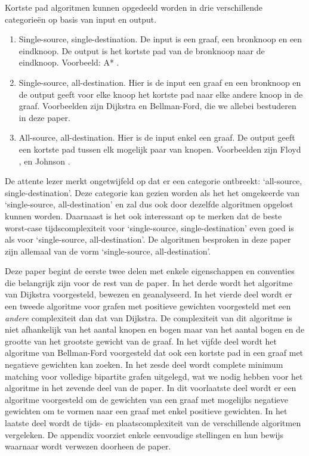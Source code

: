 \documentclass[conference]{IEEEtran}
\theoremstyle{definition}
\begin{document}
Kortste pad algoritmen kunnen opgedeeld worden in drie verschillende categorieën op basis van input en output.
\begin{enumerate}
    \item Single-source, single-destination. De input is een graaf, een bronknoop en een eindknoop. De output is het kortste pad van de bronknoop naar de eindknoop. Voorbeeld: A* \cite{A*}.
    \item Single-source, all-destination. Hier is de input een graaf en een bronknoop en de output geeft voor elke knoop het kortste pad naar elke andere knoop in de graaf. Voorbeelden zijn Dijkstra en Bellman-Ford, die we allebei bestuderen in deze paper.
    \item All-source, all-destination. Hier is de input enkel een graaf. De output geeft een kortste pad tussen elk mogelijk paar van knopen. Voorbeelden zijn Floyd \cite{Floyd}, en Johnson \cite{Johnson}.
\end{enumerate}
De attente lezer merkt ongetwijfeld op dat er een categorie ontbreekt: `all-source, single-destination'. Deze categorie kan gezien worden als het het omgekeerde van `single-source, all-destination' en zal dus ook door dezelfde algoritmen opgelost kunnen worden. Daarnaast is het ook interessant op te merken dat de beste worst-case tijdscomplexiteit voor `single-source, single-destination' even goed is als voor `single-source, all-destination'.
De algoritmen besproken in deze paper zijn allemaal van de vorm `single-source, all-destination'.

Deze paper begint de eerste twee delen met enkele eigenschappen en conventies die belangrijk zijn voor de rest van de paper.
In het derde wordt het algoritme van Dijkstra voorgesteld, bewezen en geanalyseerd.
In het vierde deel wordt er een tweede algoritme voor grafen met positieve gewichten voorgesteld met een \emph{andere} complexiteit dan dat van Dijkstra. De complexiteit van dit algoritme is niet afhankelijk van het aantal knopen en bogen maar van het aantal bogen en de grootte van het grootste gewicht van de graaf.
In het vijfde deel wordt het algoritme van Bellman-Ford voorgesteld dat ook een kortste pad in een graaf met negatieve gewichten kan zoeken.
In het zesde deel wordt complete minimum matching voor volledige bipartite grafen uitgelegd, wat we nodig hebben voor het algoritme in het zevende deel van de paper. In dit voorlaatste deel wordt er een algoritme voorgesteld om de gewichten van een graaf met mogelijks negatieve gewichten om te vormen naar een graaf met enkel positieve gewichten.
In het laatste deel wordt de tijds- en plaatscomplexiteit van de verschillende algoritmen vergeleken.
De appendix voorziet enkele eenvoudige stellingen en hun bewijs waarnaar wordt verwezen doorheen de paper.
\end{document}
